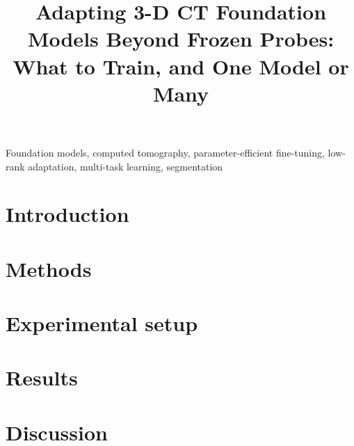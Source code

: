 \documentclass{midl}
\title[Adapting 3-D CT foundation models]{Adapting 3-D CT Foundation Models Beyond Frozen Probes: What to Train, and One Model or Many}
\begin{document}
\maketitle

\begin{abstract}

\end{abstract}

\begin{keywords}
Foundation models, computed tomography, parameter-efficient fine-tuning, low-rank adaptation, multi-task learning, segmentation
\end{keywords}

\section{Introduction}


\section{Methods}


\section{Experimental setup}
\label{sec:setup}


\section{Results}
\label{sec:results}


\section{Discussion}
\label{sec:discussion}


\clearpage


\appendix

\end{document}
